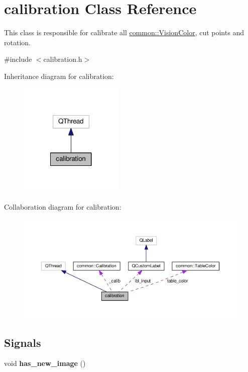 \hypertarget{classcalibration}{\section{calibration Class Reference}
\label{classcalibration}
}


This class is responsible for calibrate all \hyperlink{structcommon_1_1VisionColor}{common\-::\-Vision\-Color}, cut points and rotation.  




{\ttfamily \#include $<$calibration.\-h$>$}



Inheritance diagram for calibration\-:
\nopagebreak
\begin{figure}[H]
\begin{center}
\leavevmode
\includegraphics[width=140pt]{classcalibration__inherit__graph}
\end{center}
\end{figure}


Collaboration diagram for calibration\-:
\nopagebreak
\begin{figure}[H]
\begin{center}
\leavevmode
\includegraphics[width=350pt]{classcalibration__coll__graph}
\end{center}
\end{figure}
\subsection*{Signals}
\begin{DoxyCompactItemize}
\item 
\hypertarget{classcalibration_a7e9eab43274288524d9d3c1a9d0f3b87}{void {\bfseries has\-\_\-new\-\_\-image} ()}\label{classcalibration_a7e9eab43274288524d9d3c1a9d0f3b87}

\end{DoxyCompactItemize}
